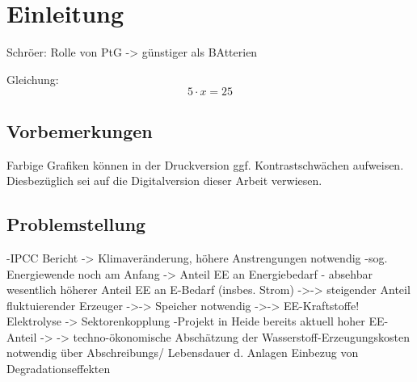 \documentclass[onecolumn,10pt,titlepage]{article}
\renewcommand*{\glossentry}[2]{%
		\glstarget{##1}{\glossentryname{##1}} %
		& \glossentrydesc{##1}%
		& \glsunit{##1}  \tabularnewline
	}
\begin{document}

\newpage

\tableofcontents

\newpage

\glsaddall

\printglossary[type=\acronymtype,style=long]  %
\printglossary[type=symbolslist,style=symbunitlong]   %
\printglossary[type=main]                     %
\pagestyle{fancy}
\section{Einleitung}
Schröer: Rolle von PtG -> günstiger als BAtterien




Gleichung:
\begin{equation}
5 \cdot x = 25
% 
% 
\end{equation}
\subsection{Vorbemerkungen}
Farbige Grafiken können in der Druckversion ggf. Kontrastschwächen aufweisen. Diesbezüglich sei auf die Digitalversion dieser Arbeit verwiesen.\\


\subsection{Problemstellung}
-IPCC Bericht -> Klimaveränderung, höhere Anstrengungen notwendig
-sog. Energiewende noch am Anfang -> Anteil EE an Energiebedarf
- absehbar wesentlich höherer Anteil EE an E-Bedarf (insbes. Strom)
->-> steigender Anteil fluktuierender Erzeuger
->-> Speicher notwendig
->-> EE-Kraftstoffe!
Elektrolyse -> Sektorenkopplung
-Projekt in Heide
bereits aktuell hoher EE-Anteil
-> -> techno-ökonomische Abschätzung der Wasserstoff-Erzeugungskosten notwendig
über Abschreibungs/ Lebensdauer d. Anlagen
Einbezug von Degradationseffekten
\end{document}
